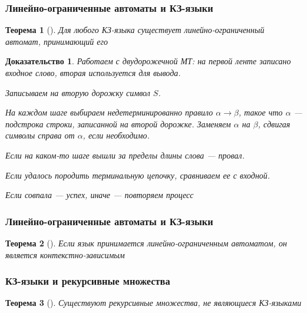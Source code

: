 \documentclass{beamer}
\newtheorem{rutheorem}{Теорема}
\newtheorem{ruproof}{Доказательство}
\begin{document}
\begin{frame}[fragile]
  \transwipe[direction=90]
  \frametitle{Линейно-ограниченные автоматы и КЗ-языки}
  \begin{rutheorem}[]
    Для любого КЗ-языка существует линейно-ограниченный автомат, принимающий его 
  \end{rutheorem}

  \begin{ruproof}
   Работаем с двудорожечной МТ: на первой ленте записано входное слово, вторая используется для вывода.
   
   Записываем на вторую дорожку символ $S$.
   
   На каждом шаге выбираем недетерминированно правило $\alpha \rightarrow \beta$, такое что $\alpha$ --- подстрока строки, записанной на второй дорожке. Заменяем $\alpha$ на $\beta$, сдвигая символы справа от $\alpha$, если необходимо.
   
   Если на каком-то шаге вышли за пределы длины слова --- провал. 
   
   Если удалось породить терминальную цепочку, сравниваем ее с входной. 
   
   Если совпала --- успех, иначе --- повторяем процесс
  \end{ruproof}

\end{frame}

\begin{frame}[fragile]
  \transwipe[direction=90]
  \frametitle{Линейно-ограниченные автоматы и КЗ-языки}
  \begin{rutheorem}[]
    Если язык принимается линейно-ограниченным автоматом, он является контекстно-зависимым
  \end{rutheorem}
\end{frame}

\begin{frame}[fragile]
  \transwipe[direction=90]
  \frametitle{КЗ-языки и рекурсивные множества}
  \begin{rutheorem}[]
    Существуют рекурсивные множества, не являющиеся КЗ-языками
  \end{rutheorem}
\end{frame}
\end{document}
